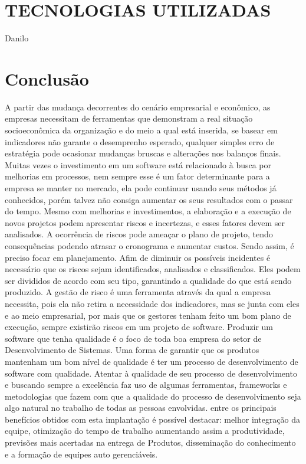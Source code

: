 \documentclass[12pt]{article}
\begin{document}
    \section{TECNOLOGIAS UTILIZADAS }
        Danilo
        
    \section{Conclusão}
    
        A partir das mudança decorrentes do cenário empresarial e econômico, as empresas necessitam de ferramentas que  demonstram a real situação socioeconômica da organização e do meio a qual está inserida, se basear em indicadores não garante o desemprenho esperado, qualquer simples erro de estratégia pode ocasionar mudanças bruscas e alterações nos balanços finais.
        Muitas vezes o investimento em um software está relacionado à busca por melhorias em processos, nem sempre esse é um fator determinante para a empresa se manter no mercado, ela pode continuar usando seus métodos já conhecidos, porém talvez não consiga aumentar os seus resultados com o passar do tempo.
        Mesmo com melhorias e investimentos, a elaboração e a execução de novos projetos podem apresentar riscos e incertezas, e esses fatores devem ser analisados. A ocorrência de riscos pode ameaçar o plano de projeto, tendo consequências podendo atrasar o cronograma e aumentar custos. Sendo assim, é preciso focar em planejamento.
        Afim de diminuir os possíveis incidentes é necessário que os riscos sejam identificados, analisados e classificados. Eles podem ser divididos de acordo com seu tipo, garantindo a qualidade do que está sendo produzido.
        A gestão de risco é uma ferramenta através da qual a empresa necessita, pois ela não retira a necessidade dos indicadores, mas se junta com eles e ao meio empresarial, por mais que os gestores tenham feito um bom plano de execução, sempre existirão riscos em um projeto de software.
        Produzir um software que tenha qualidade é o foco de toda boa empresa do setor de Desenvolvimento de Sistemas.
        Uma forma de garantir que os produtos mantenham um bom nível de qualidade é ter um processo de desenvolvimento de software com qualidade.
        Atentar à qualidade de seu processo de desenvolvimento e buscando sempre a excelência faz uso de algumas ferramentas,
        frameworks e metodologias que fazem com que a qualidade do processo de desenvolvimento seja algo natural no trabalho de todas as pessoas envolvidas.
        entre os principais benefícios obtidos com esta implantação é possível destacar: melhor integração da equipe, 
        otimização do tempo de trabalho aumentando assim a produtividade, previsões mais acertadas na entrega de Produtos, disseminação do conhecimento e a formação de equipes auto gerenciáveis.
        
    \nocite{*}
    
    
\end{document}
